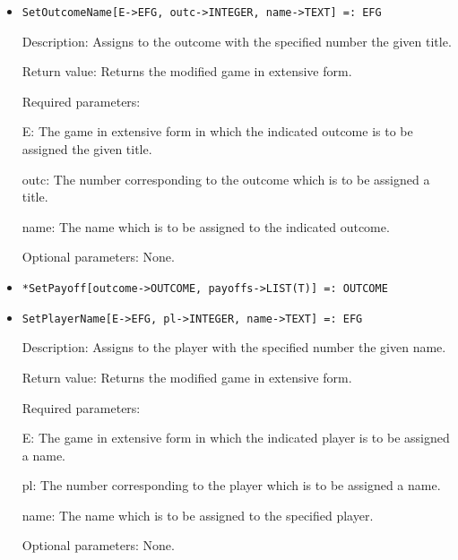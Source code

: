 \begin{itemize}
\item

\protect \large \begin{verbatim}
SetOutcomeName[E->EFG, outc->INTEGER, name->TEXT] =: EFG
\end{verbatim}\normalsize

\bd
\item
[Description:] Assigns to the outcome with the specified number the
given title.
\item
[Return value:] Returns the modified game in extensive form.
\item
[Required parameters:]\hfil\null
	
\bd
\item
[E:] The game in extensive form in which the indicated outcome is
to be assigned the given title.
\item
[outc:] The number corresponding to the outcome which is to be
assigned a title.
\item
[name:] The name which is to be assigned to the indicated outcome.
\ed

\item
[Optional parameters:] None.
\ed

\item
\protect \large \begin{verbatim}
*SetPayoff[outcome->OUTCOME, payoffs->LIST(T)] =: OUTCOME
\end{verbatim}\normalsize



\item

\protect \large \begin{verbatim}
SetPlayerName[E->EFG, pl->INTEGER, name->TEXT] =: EFG
\end{verbatim}\normalsize

\bd
\item
[Description:] Assigns to the player with the specified number the
given name.
\item
[Return value:] Returns the modified game in extensive form.
\item
[Required parameters:]\hfil\null

\bd
\item
[E:] The game in extensive form in which the indicated player is to
be assigned a name.
\item
[pl:] The number corresponding to the player which is to be assigned a
name.
\item
[name:] The name which is to be assigned to the specified player.
\ed
\item
[Optional parameters:] None.
\ed


\end{itemize}

